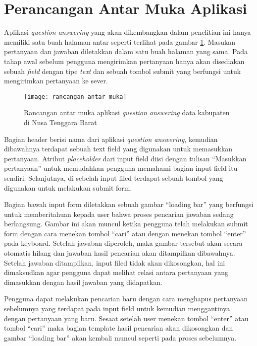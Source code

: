 \section{Perancangan Antar Muka Aplikasi}
Aplikasi \emph{question answering} yang akan dikembangkan dalam penelitian ini hanya memiliki satu buah halaman antar seperti terlihat pada gambar \ref{fig:rancangan_antarmuka}. Masukan pertanyaan dan jawaban diletakkan dalam satu buah halaman yang sama. Pada tahap awal sebelum pengguna mengirimkan pertanyaan hanya akan disediakan sebuah \emph{field} dengan tipe \emph{text} dan sebuah tombol submit yang berfungsi untuk mengirimkan pertanyaan ke sever.

\begin{figure}[h]
    \centering
    \texttt{[image: rancangan\_antar\_muka]}
    \caption{Rancangan antar muka aplikasi \emph{question answering} data kabupaten di Nusa Tenggara Barat}
    \label{fig:rancangan_antarmuka}
\end{figure}

Bagian header berisi nama dari aplikasi \emph{question answering}, kemudian dibawahnya terdapat sebuah text field yang digunakan untuk memasukkan pertanyaan. Atribut \emph{placeholder} dari input field diisi dengan tulisan ``Masukkan pertanyaan'' untuk memudahkan pengguna memahami bagian input field itu sendiri. Selanjutnya, di sebelah input filed terdapat sebuah tombol yang digunakan untuk melakukan submit form.

Bagian bawah input form diletakkan sebuah gambar ``loading bar'' yang berfungsi untuk memberitahuan kepada user bahwa proses pencarian jawaban sedang berlangsung. Gambar ini akan muncul ketika pengguna telah melakukan submit form dengan cara menekan tombol ``cari'' atau dengan menekan tombol ``enter'' pada keyboard. Setelah jawaban diperoleh, maka gambar tersebut akan secara otomatis hilang dan jawaban hasil pencarian akan ditampilkan dibawahnya. Setelah jawaban ditampilkan, input filed tidak akan dikosongkan, hal ini dimaksudkan agar pengguna dapat melihat relasi antara pertanyaan yang dimasukkan dengan hasil jawaban yang didapatkan.

Pengguna dapat melakukan pencarian baru dengan cara menghapus pertanyaan sebelumnya yang terdapat pada input field untuk kemudian menggantinya dengan pertanyaan yang baru. Sesaat setelah user menekan tombol ``enter'' atau tombol ``cari'' maka bagian template hasil pencarian akan dikosongkan dan gambar ``loading bar'' akan kembali muncul seperti pada proses sebelumnya.
